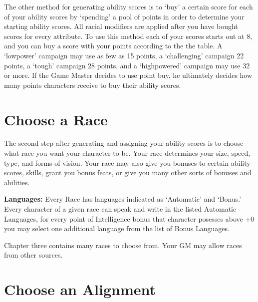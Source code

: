 The other method for generating ability scores is to `buy' a certain score for each of your ability scores by `spending' a pool of points in order to determine your starting ability scores.  All racial modifiers are applied after you have bought scores for every attribute.  To use this method each of your scores starts out at 8, and you can buy a score with your points according to the the table. A `low\textendash power' campaign may use as few as 15 points, a `challenging' campaign 22 points, a `tough' campaign 28 points, and a `high\textendash powered' campaign may use 32 or more.  If the Game Master decides to use point buy, he ultimately decides how many points characters receive to buy their ability scores.

\section{Choose a Race}

The second step after generating and assigning your ability scores is to choose what race you want your character to be.  Your race determines your size, speed, type, and forms of vision.  Your race may also give you bonuses to certain ability scores, skills, grant you bonus feats, or give you many other sorts of bonuses and abilities.

\textbf{Languages: }Every Race has languages indicated as `Automatic' and `Bonus.'  Every character of a given race can speak and write in the listed Automatic Languages, for every point of Intelligence bonus that character posesses above +0 you may select one additional language from the list of Bonus Languages.

Chapter three contains many races to choose from.  Your GM may allow races from other sources.

\section{Choose an Alignment}

